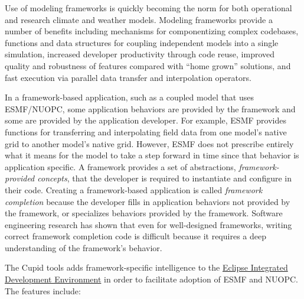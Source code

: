 \documentclass[oneside,11pt]{memoir}
\begin{document}
Use of modeling frameworks is quickly becoming the norm for both operational and research climate and weather models. Modeling frameworks provide a number of benefits including mechanisms for componentizing complex codebases, functions and data structures for coupling independent models into a single simulation, increased developer productivity through code reuse, improved quality and robustness of features compared with ``home grown'' solutions, and fast execution via parallel data transfer and interpolation operators. 

In a framework-based application, such as a coupled model that uses ESMF/NUOPC, some application behaviors are provided by the framework and some are provided by the application developer. For example, ESMF provides functions for transferring and interpolating field data from one model's native grid to another model's native grid. However, ESMF does not prescribe entirely what it means for the model to take a step forward in time since that behavior is application specific. A framework provides a set of abstractions, \emph{framework-provided concepts}, that the developer is required to instantiate and configure in their code. Creating a framework-based application is called \emph{framework completion} because the developer fills in application behaviors not provided by the framework, or specializes  behaviors provided by the framework. Software engineering research has shown that even for well-designed frameworks, writing correct framework completion code is difficult because it requires a deep understanding of the framework's behavior.

The Cupid tools adds framework-specific intelligence to the \href{https://www.eclipse.org/}{Eclipse Integrated Development Environment} in order to facilitate adoption of ESMF and NUOPC. The features include:
\end{document}
